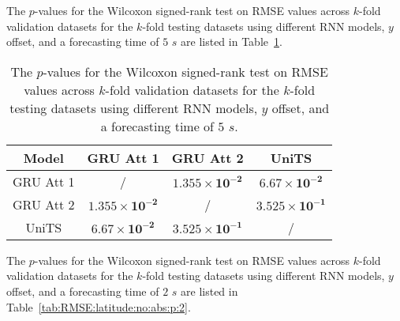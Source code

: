 The $p$-values for the Wilcoxon signed-rank test on RMSE values across $k$-fold validation datasets for the $k$-fold testing datasets using different RNN models, $y$ offset, and a forecasting time of $5$ $s$ are listed in Table~\ref{tab:RMSE:latitude:no:abs:p:5}.

\begin{table}[!ht]
	\centering
	\begin{tabular}{|c|c|c|c|}
		\hline
		Model & GRU Att 1 & GRU Att 2 & UniTS \\ \hline
		GRU Att 1 & / & $\mathbf{1.355 \times 10^{-2}}$ & $\mathbf{6.67 \times 10^{-2}}$ \\ \hline
		GRU Att 2 & $\mathbf{1.355 \times 10^{-2}}$ & / & $\mathbf{3.525 \times 10^{-1}}$ \\ \hline
		UniTS & $\mathbf{6.67 \times 10^{-2}}$ & $\mathbf{3.525 \times 10^{-1}}$ & / \\ \hline
	\end{tabular}
	\caption{The $p$-values for the Wilcoxon signed-rank test on RMSE values across $k$-fold validation datasets for the $k$-fold testing datasets using different RNN models, $y$ offset, and a forecasting time of $5$ $s$.}
	\label{tab:RMSE:latitude:no:abs:p:5}
\end{table}

The $p$-values for the Wilcoxon signed-rank test on RMSE values across $k$-fold validation datasets for the $k$-fold testing datasets using different RNN models, $y$ offset, and a forecasting time of $2$ $s$ are listed in Table~\ref{tab:RMSE:latitude:no:abs:p:2}.

